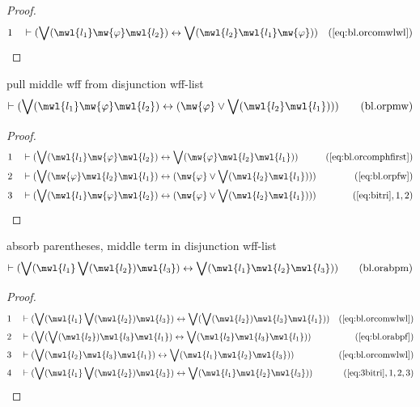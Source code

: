 \begin{proof}
\begin{align}
  1 &&  & \vdash ( \bigvee( \mwl{l_1} \mw{\varphi} \mwl{l_2} ) \leftrightarrow \bigvee( \mwl{l_2} \mwl{l_1} \mw{\varphi} ) )&(\mbox{\ref{eq:bl.orcomwlwl}})\notag
\end{align}
\end{proof}

\begin{lemma} pull middle wff from disjunction wff-list
\begin{align}
\vdash ( \bigvee( \mwl{l_1} \mw{\varphi} \mwl{l_2} ) \leftrightarrow (
    \mw{\varphi} \vee \bigvee( \mwl{l_2} \mwl{l_1} ) )
    )\label{eq:bl.orpmw}\tag{bl.orpmw}
\end{align}
\end{lemma}

\begin{proof}
\begin{align}
  1 &&  & \vdash ( \bigvee( \mwl{l_1} \mw{\varphi} \mwl{l_2} ) \leftrightarrow \bigvee( \mw{\varphi} \mwl{l_2} \mwl{l_1} ) )&(\mbox{\ref{eq:bl.orcomphfirst}})\notag
  \\ 2 &&  & \vdash ( \bigvee( \mw{\varphi} \mwl{l_2} \mwl{l_1} ) \leftrightarrow ( \mw{\varphi} \vee \bigvee( \mwl{l_2} \mwl{l_1} ) ) )&(\mbox{\ref{eq:bl.orpfw}})\notag
  \\ 3 &&  & \vdash ( \bigvee( \mwl{l_1} \mw{\varphi} \mwl{l_2} ) \leftrightarrow ( \mw{\varphi} \vee \bigvee( \mwl{l_2} \mwl{l_1} ) ) )&(\mbox{\ref{eq:bitri}},1,2)\notag
\end{align}
\end{proof}

\begin{lemma} absorb parentheses, middle term in
disjunction wff-list
\begin{align}
\vdash ( \bigvee( \mwl{l_1} \bigvee( \mwl{l_2} ) \mwl{l_3} ) \leftrightarrow
    \bigvee( \mwl{l_1} \mwl{l_2} \mwl{l_3} )
    )\label{eq:bl.orabpm}\tag{bl.orabpm}
\end{align}
\end{lemma}

\begin{proof}
\begin{align}
  1 &&  & \vdash ( \bigvee( \mwl{l_1} \bigvee( \mwl{l_2} ) \mwl{l_3} ) \leftrightarrow \bigvee( \bigvee( \mwl{l_2} ) \mwl{l_3} \mwl{l_1} ) )&(\mbox{\ref{eq:bl.orcomwlwl}})\notag
  \\ 2 &&  & \vdash ( \bigvee( \bigvee( \mwl{l_2} ) \mwl{l_3} \mwl{l_1} ) \leftrightarrow \bigvee( \mwl{l_2} \mwl{l_3} \mwl{l_1} ) )&(\mbox{\ref{eq:bl.orabpf}})\notag
  \\ 3 &&  & \vdash ( \bigvee( \mwl{l_2} \mwl{l_3} \mwl{l_1} ) \leftrightarrow \bigvee( \mwl{l_1} \mwl{l_2} \mwl{l_3} ) )&(\mbox{\ref{eq:bl.orcomwlwl}})\notag
  \\ 4 &&  & \vdash ( \bigvee( \mwl{l_1} \bigvee( \mwl{l_2} ) \mwl{l_3} ) \leftrightarrow \bigvee( \mwl{l_1} \mwl{l_2} \mwl{l_3} ) )&(\mbox{\ref{eq:3bitri}},1,2,3)\notag
\end{align}
\end{proof}

